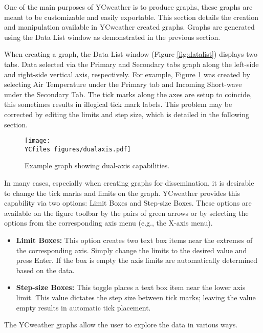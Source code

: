 \label{YC:sec:graphs}
\newcommand{\nitem}[1]{\item{\textbf{#1}}}
One of the main purposes of YCweather is to produce graphs, these graphs are meant to be customizable and easily exportable.  This section details the creation and manipulation available in YCweather created graphs.  Graphs are generated using the Data List window as demonstrated in the previous section.

When creating a graph, the Data List window (Figure \ref{fig:datalist}) displays two tabs.  Data selected via the Primary and Secondary tabs graph along the left-side and right-side vertical axis, respectively.  For example, Figure \ref{fig:dualaxis} was created by selecting Air Temperature under the Primary tab and Incoming Short-wave under the Secondary Tab. The tick marks along the axes are setup to coincide, this sometimes results in illogical tick mark labels.  This problem may be corrected by editing the limits and step size, which is detailed in the following section.

\begin{figure}[ht!]\centering
	\texttt{[image: \\YCfiles figures/dualaxis.pdf]}
	\caption{Example graph showing dual-axis capabilities.}
	\label{fig:dualaxis}
\end{figure}

\label{sec:editlimit}
In many cases, especially when creating graphs for dissemination, it is desirable to change the tick marks and limits on the graph.  YCweather provides this capability via two options: Limit Boxes and Step-size Boxes.  These options are available on the figure toolbar by the pairs of green arrows or by selecting the options from the corresponding axis menu (e.g., the X-axis menu).
\begin{itemize}
	\nitem{Limit Boxes:} This option creates two text box items near the extremes of the corresponding axis.  Simply change the limits to the desired value and press Enter.  If the box is empty the axis limits are automatically determined based on the data.
	\nitem{Step-size Boxes:} This toggle places a text box item near the lower axis limit.  This value dictates the step size between tick marks; leaving the value empty results in automatic tick placement.
\end{itemize}

\label{sec:exploredata}
The YCweather graphs allow the user to explore the data in various ways.

